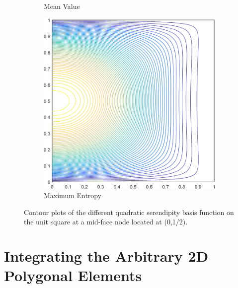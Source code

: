 \begin{figure}
\begin{subfigure}[b]{0.39\textwidth}
		\caption{Mean Value}
	\end{subfigure}
	\hspace{1.5cm}
	\begin{subfigure}[b]{0.39\textwidth}
		\centering
		\includegraphics[width=\textwidth]{figures/sec_BF/square_MAXENT2_contour_b8.png}
		\caption{Maximum Entropy}
	\end{subfigure}
\caption[Contour plots of the quadratic basis functions on the unit square.]{Contour plots of the different quadratic serendipity basis function on the unit square at a mid-face node located at (0,1/2).}
\label{fig::2D_Quadratic_Summary_unit_square_basis_functions_BF8}
\end{figure}



\section{Integrating the Arbitrary 2D Polygonal Elements}
\label{sec::BF_2DIntegration}

